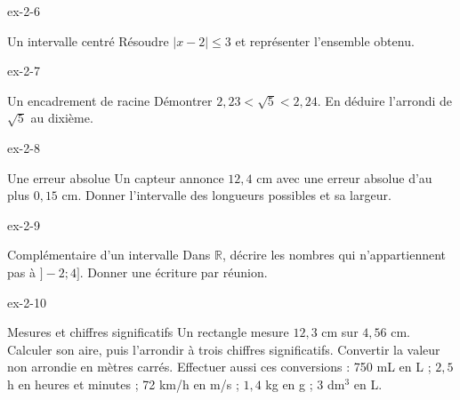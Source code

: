 \clearpage{}
\begin{blocLivre}{ex-2-6}
\begin{exercice}[2]{Un intervalle centré}
Résoudre $|x-2|\le3$ et représenter l’ensemble obtenu.
\label{fig-ex-2-6}
\end{exercice}
\end{blocLivre}
\begin{blocLivre}{ex-2-7}
\begin{exercice}[2]{Un encadrement de racine}
Démontrer $2{,}23<\sqrt5<2{,}24$. En déduire l’arrondi de $\sqrt5$ au dixième.
\end{exercice}
\end{blocLivre}
\begin{blocLivre}{ex-2-8}
\begin{exercice}[2]{Une erreur absolue}
Un capteur annonce $12{,}4$ cm avec une erreur absolue d’au plus $0{,}15$ cm. Donner l’intervalle des longueurs possibles et sa largeur.
\end{exercice}
\end{blocLivre}
\begin{blocLivre}{ex-2-9}
\begin{exercice}[2]{Complémentaire d’un intervalle}
Dans $\mathbb R$, décrire les nombres qui n’appartiennent pas à $]-2;4]$. Donner une écriture par réunion.
\end{exercice}
\end{blocLivre}
\begin{blocLivre}{ex-2-10}
\begin{exercice}[2]{Mesures et chiffres significatifs}
Un rectangle mesure $12{,}3$ cm sur $4{,}56$ cm. Calculer son aire, puis l’arrondir à trois chiffres significatifs. Convertir la valeur non arrondie en mètres carrés. Effectuer aussi ces conversions : 750 mL en L ; $2{,}5$ h en heures et minutes ; 72 km/h en m/s ; $1{,}4$ kg en g ; 3 dm$^3$ en L.
\end{exercice}
\end{blocLivre}

